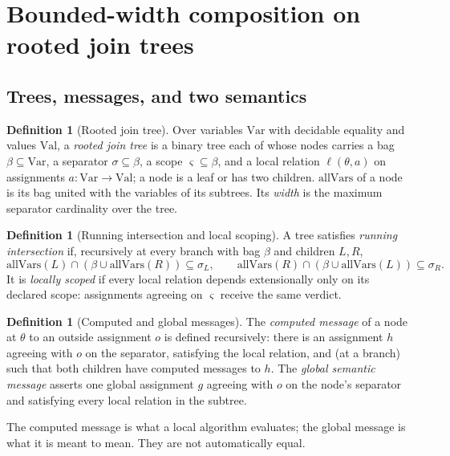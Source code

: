 \documentclass[11pt,a4paper]{article}
\theoremstyle{plain}
\theoremstyle{definition}
\newtheorem{definition}[theorem]{Definition}
\theoremstyle{remark}
\begin{document}
\section{Bounded-width composition on rooted join trees}\label{sec:junction}

\subsection{Trees, messages, and two semantics}

\begin{definition}[Rooted join tree]
Over variables $\mathrm{Var}$ with decidable equality and values $\mathrm{Val}$, a \emph{rooted join tree} is a binary tree each of whose nodes carries a bag $\beta\subseteq\mathrm{Var}$, a separator $\sigma\subseteq\beta$, a scope $\varsigma\subseteq\beta$, and a local relation $\ell(\theta,a)$ on assignments $a:\mathrm{Var}\to\mathrm{Val}$; a node is a leaf or has two children. $\mathrm{allVars}$ of a node is its bag united with the variables of its subtrees. Its \emph{width} is the maximum separator cardinality over the tree.
\end{definition}

\begin{definition}[Running intersection and local scoping]
A tree satisfies \emph{running intersection} if, recursively at every branch with bag $\beta$ and children $L,R$,
\[
\mathrm{allVars}(L)\cap(\beta\cup\mathrm{allVars}(R))\subseteq\sigma_L,\qquad
\mathrm{allVars}(R)\cap(\beta\cup\mathrm{allVars}(L))\subseteq\sigma_R .
\]
It is \emph{locally scoped} if every local relation depends extensionally only on its declared scope: assignments agreeing on $\varsigma$ receive the same verdict.
\end{definition}

\begin{definition}[Computed and global messages]
The \emph{computed message} of a node at $\theta$ to an outside assignment $o$ is defined recursively: there is an assignment $h$ agreeing with $o$ on the separator, satisfying the local relation, and (at a branch) such that both children have computed messages to $h$. The \emph{global semantic message} asserts one global assignment $g$ agreeing with $o$ on the node's separator and satisfying every local relation in the subtree.
\end{definition}

The computed message is what a local algorithm evaluates; the global message is what it is meant to mean. They are not automatically equal.
\end{document}
